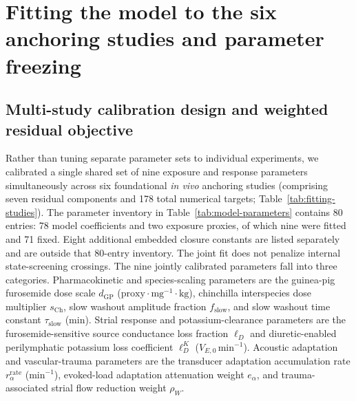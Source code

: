 \documentclass[final,5p,times]{elsarticle}
\begin{document}
\section{Fitting the model to the six anchoring studies and parameter freezing}\label{sec:calibration}

\subsection{Multi-study calibration design and weighted residual objective}\label{sec:calibration-design}

Rather than tuning separate parameter sets to individual experiments, we calibrated a single shared set of nine exposure and response parameters simultaneously across six foundational \emph{in vivo} anchoring studies (comprising seven residual components and 178 total numerical targets; Table~\ref{tab:fitting-studies}). The parameter inventory in Table~\ref{tab:model-parameters} contains 80 entries: 78 model coefficients and two exposure proxies, of which nine were fitted and 71 fixed. Eight additional embedded closure constants are listed separately and are outside that 80-entry inventory. The joint fit does not penalize internal state-screening crossings. The nine jointly calibrated parameters fall into three categories. Pharmacokinetic and species-scaling parameters are the guinea-pig furosemide dose scale \(d_{\mathrm{GP}}\) (\(\mathrm{proxy}\cdot\mathrm{mg}^{-1}\cdot\mathrm{kg}\)), chinchilla interspecies dose multiplier \(s_{\mathrm{Ch}}\), slow washout amplitude fraction \(f_{\mathrm{slow}}\), and slow washout time constant \(\tau_{\mathrm{slow}}\) (min). Strial response and potassium-clearance parameters are the furosemide-sensitive source conductance loss fraction \(\ell_D\) and diuretic-enabled perilymphatic potassium loss coefficient \(\ell_D^K\) (\(V_{E,0}\,\mathrm{min}^{-1}\)). Acoustic adaptation and vascular-trauma parameters are the transducer adaptation accumulation rate \(r_\alpha^{\mathrm{rate}}\) (\(\mathrm{min}^{-1}\)), evoked-load adaptation attenuation weight \(e_\alpha\), and trauma-associated strial flow reduction weight \(\rho_W\).
\end{document}
